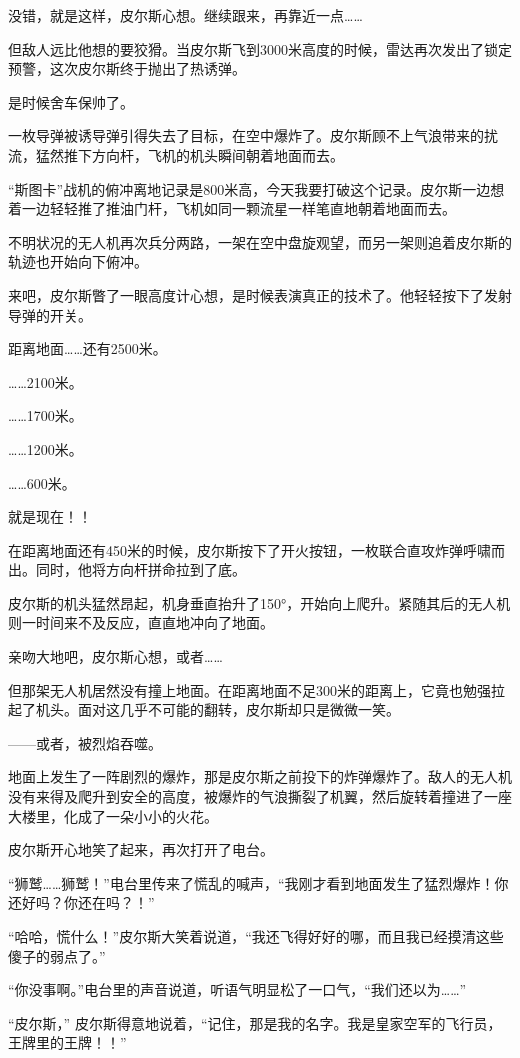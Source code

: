 没错，就是这样，皮尔斯心想。继续跟来，再靠近一点……

但敌人远比他想的要狡猾。当皮尔斯飞到3000米高度的时候，雷达再次发出了锁定预警，这次皮尔斯终于抛出了热诱弹。

是时候舍车保帅了。

一枚导弹被诱导弹引得失去了目标，在空中爆炸了。皮尔斯顾不上气浪带来的扰流，猛然推下方向杆，飞机的机头瞬间朝着地面而去。

“斯图卡”战机的俯冲离地记录是800米高，今天我要打破这个记录。皮尔斯一边想着一边轻轻推了推油门杆，飞机如同一颗流星一样笔直地朝着地面而去。

不明状况的无人机再次兵分两路，一架在空中盘旋观望，而另一架则追着皮尔斯的轨迹也开始向下俯冲。

来吧，皮尔斯瞥了一眼高度计心想，是时候表演真正的技术了。他轻轻按下了发射导弹的开关。

距离地面……还有2500米。

……2100米。

……1700米。

……1200米。

……600米。

就是现在！！

在距离地面还有450米的时候，皮尔斯按下了开火按钮，一枚联合直攻炸弹呼啸而出。同时，他将方向杆拼命拉到了底。

皮尔斯的机头猛然昂起，机身垂直抬升了150°，开始向上爬升。紧随其后的无人机则一时间来不及反应，直直地冲向了地面。

亲吻大地吧，皮尔斯心想，或者……

但那架无人机居然没有撞上地面。在距离地面不足300米的距离上，它竟也勉强拉起了机头。面对这几乎不可能的翻转，皮尔斯却只是微微一笑。

——或者，被烈焰吞噬。

地面上发生了一阵剧烈的爆炸，那是皮尔斯之前投下的炸弹爆炸了。敌人的无人机没有来得及爬升到安全的高度，被爆炸的气浪撕裂了机翼，然后旋转着撞进了一座大楼里，化成了一朵小小的火花。

皮尔斯开心地笑了起来，再次打开了电台。

“狮鹫……狮鹫！”电台里传来了慌乱的喊声，“我刚才看到地面发生了猛烈爆炸！你还好吗？你还在吗？！”

“哈哈，慌什么！”皮尔斯大笑着说道，“我还飞得好好的哪，而且我已经摸清这些傻子的弱点了。”

“你没事啊。”电台里的声音说道，听语气明显松了一口气，“我们还以为……”

“皮尔斯，” 皮尔斯得意地说着，“记住，那是我的名字。我是皇家空军的飞行员，王牌里的王牌！！”

